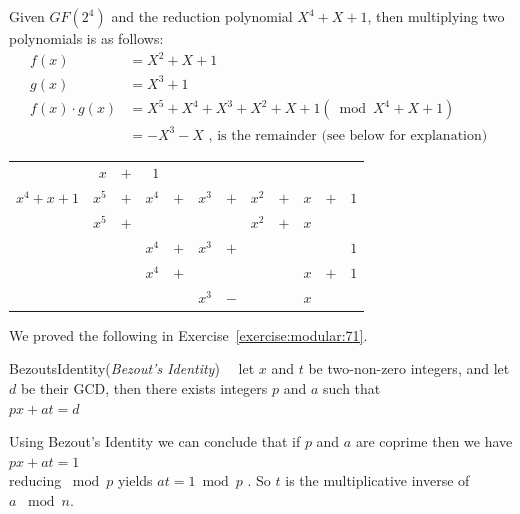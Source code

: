 \begin{eg} Given $GF(2^4)$ and the reduction polynomial $X^4 + X + 1$, then multiplying two polynomials is as follows:
\begin{align*}	
	f(x) &=  X^2 + X + 1\\
	g(x) &= X^3 + 1\\
 f(x) \cdot g(x) &= X^5 + X^4 + X^3 + X^2 + X + 1 (\bmod X^4 + X + 1)\\ 
	       &= - X^3 - X \text{ , is the remainder (see below for explanation) }
\end{align*}
\begin{center}
\begin{tabular}{rrcrcrcrcrcr}
        &  $x$  &  $+$  &      $1$         \\ \cline{2-12}
 \multicolumn{1}{r|}{$x^4 + x + 1$}
        &  $x^5$  &  $+$  &  $x^4$  &  $+$  & $ x^3$  &  $+$  &  $x^2$  &  $+$  & $ x$  &  $+$  &  $1$  \\
        & $x^5$   &  $+$  &       	&          &      	  &          &  $x^2$   & $+$  &  $x$     \\ \cline{2-12}
        &         &       &         $x^4$  & $+$   &  $ x^3$  &   $+$  &             &         &         &          &  $1$  \\
        &         &       &         $x^4$  &  $+$  &             &           &              &         &  $x$   & $+$  &  $1$   \\ \cline{4-12}
        &         &       &                    &          &   $x^3$ &    $-$  &              &         &  $x$    
\end{tabular}
\end{center}
\end{eg}
We proved the following in Exercise~\ref{exercise:modular:71}.

\begin{prop}{BezoutsIdentity}(\emph{Bezout's Identity})~~ let $x$ and $t$ be two-non-zero integers, and let $d$ be their GCD, then there exists integers $p$ and $a$ such that\\
 \hspace*{\parindent} $px + at = d$
\end{prop}

\begin{corollary}
Using Bezout's Identity we can conclude that if $p$ and $a$ are coprime then we have\\
\hspace*{\parindent} $px + at = 1$ \\
reducing $\bmod p$ yields $at = 1 \bmod p$ .  So $t$ is the multiplicative inverse of\\
 $a$ $\bmod n$.
\end{corollary}

